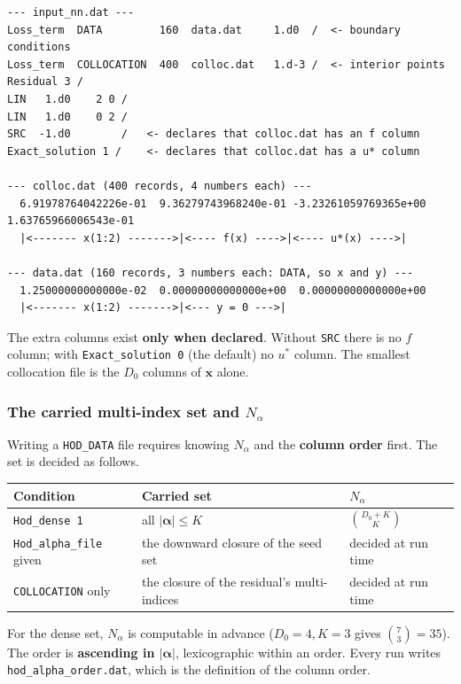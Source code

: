 \documentclass[10pt,a4paper]{article}
\newcommand{\code}[1]{\texttt{#1}}
\newcommand{\mi}[1]{\boldsymbol{#1}}
\begin{document}
\begin{verbatim}
--- input_nn.dat ---
Loss_term  DATA         160  data.dat     1.d0  /  <- boundary conditions
Loss_term  COLLOCATION  400  colloc.dat   1.d-3 /  <- interior points
Residual 3 /
LIN   1.d0    2 0 /
LIN   1.d0    0 2 /
SRC  -1.d0        /   <- declares that colloc.dat has an f column
Exact_solution 1 /    <- declares that colloc.dat has a u* column

--- colloc.dat (400 records, 4 numbers each) ---
  6.91978764042226e-01  9.36279743968240e-01 -3.23261059769365e+00  1.63765966006543e-01
  |<------- x(1:2) ------->|<---- f(x) ---->|<---- u*(x) ---->|

--- data.dat (160 records, 3 numbers each: DATA, so x and y) ---
  1.25000000000000e-02  0.00000000000000e+00  0.00000000000000e+00
  |<------- x(1:2) ------->|<--- y = 0 --->|
\end{verbatim}

The extra columns exist \textbf{only when declared}. Without
\code{SRC} there is no $f$ column; with \code{Exact\_solution 0}
(the default) no $u^*$ column. The smallest collocation file is the
$D_0$ columns of $\mi{x}$ alone.

\subsubsection{The carried multi-index set and $N_\alpha$}
\label{sec:nalpha}

Writing a \code{HOD\_DATA} file requires knowing $N_\alpha$ and the
\textbf{column order} first. The set is decided as follows.

\begin{center}
\begin{tabular}{@{}lll@{}}
\toprule
Condition & Carried set & $N_\alpha$ \\
\midrule
\code{Hod\_dense 1} & all $|\mi\alpha|\le K$ & $\binom{D_0+K}{K}$ \\
\code{Hod\_alpha\_file} given & the downward closure of the seed set & decided at run time \\
\code{COLLOCATION} only & the closure of the residual's multi-indices & decided at run time \\
\bottomrule
\end{tabular}
\end{center}

For the dense set, $N_\alpha$ is computable in advance ($D_0=4,K=3$
gives $\binom{7}{3}=35$). The order is \textbf{ascending in
$|\mi\alpha|$}, lexicographic within an order. Every run writes
\code{hod\_alpha\_order.dat}, which is the definition of the column
order.
\end{document}
